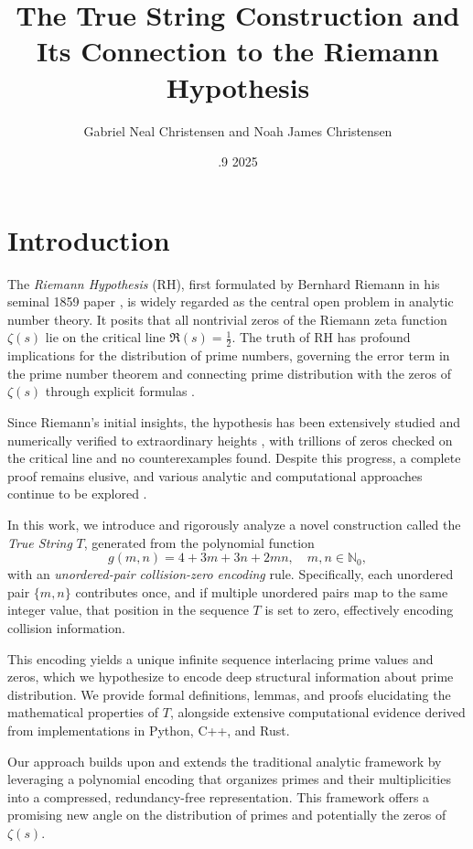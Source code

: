 \documentclass[12pt]{article}
\title{The True String Construction and Its Connection to the Riemann Hypothesis}
\author{Gabriel Neal Christensen and Noah James Christensen}
\date{\August.9 2025}
\begin{document}
\maketitle
\tableofcontents
\newpage

\section{Introduction}

The \emph{Riemann Hypothesis} (RH), first formulated by Bernhard Riemann in his seminal 1859 paper \cite{Riemann1859}, is widely regarded as the central open problem in analytic number theory. It posits that all nontrivial zeros of the Riemann zeta function \(\zeta(s)\) lie on the critical line \(\Re(s) = \frac{1}{2}\). The truth of RH has profound implications for the distribution of prime numbers, governing the error term in the prime number theorem and connecting prime distribution with the zeros of \(\zeta(s)\) through explicit formulas \cite{vonKoch1901, Edwards1974}.

Since Riemann's initial insights, the hypothesis has been extensively studied and numerically verified to extraordinary heights \cite{Odlyzko1987, Platt2021, Trudgian2020}, with trillions of zeros checked on the critical line and no counterexamples found. Despite this progress, a complete proof remains elusive, and various analytic and computational approaches continue to be explored \cite{Conrey2003, IwaniecKowalski2004}.

In this work, we introduce and rigorously analyze a novel construction called the \emph{True String} \(T\), generated from the polynomial function
\[
g(m,n) = 4 + 3m + 3n + 2mn, \quad m,n \in \mathbb{N}_0,
\]
with an \emph{unordered-pair collision-zero encoding} rule. Specifically, each unordered pair \(\{m,n\}\) contributes once, and if multiple unordered pairs map to the same integer value, that position in the sequence \(T\) is set to zero, effectively encoding collision information.

This encoding yields a unique infinite sequence interlacing prime values and zeros, which we hypothesize to encode deep structural information about prime distribution. We provide formal definitions, lemmas, and proofs elucidating the mathematical properties of \(T\), alongside extensive computational evidence derived from implementations in Python, C++, and Rust.

Our approach builds upon and extends the traditional analytic framework by leveraging a polynomial encoding that organizes primes and their multiplicities into a compressed, redundancy-free representation. This framework offers a promising new angle on the distribution of primes and potentially the zeros of \(\zeta(s)\).
\end{document}
